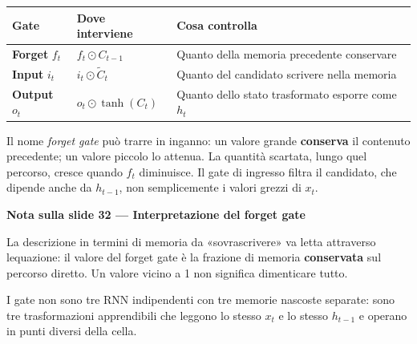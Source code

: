 \documentclass[11pt,a4paper,oneside,openany]{book}
\renewenvironment{quote}{\list{}{\leftmargin=1em\rightmargin=0pt}\item\relax}{\endlist}
\begin{document}
\begin{longtable}[]{@{}
  >{\raggedright\arraybackslash}p{}
  >{\raggedright\arraybackslash}p{}
  >{\raggedright\arraybackslash}p{}@{}}
\toprule\noalign{}
\begin{minipage}[b]{\linewidth}\raggedright
Gate
\end{minipage} & \begin{minipage}[b]{\linewidth}\raggedright
Dove interviene
\end{minipage} & \begin{minipage}[b]{\linewidth}\raggedright
Cosa controlla
\end{minipage} \\
\midrule\noalign{}
\endhead
\bottomrule\noalign{}
\endlastfoot
\textbf{Forget} \(f_t\) & \(f_t\odot C_{t-1}\) & Quanto della memoria precedente conservare \\
\textbf{Input} \(i_t\) & \(i_t\odot\widetilde C_t\) & Quanto del candidato scrivere nella memoria \\
\textbf{Output} \(o_t\) & \(o_t\odot\tanh(C_t)\) & Quanto dello stato trasformato esporre come \(h_t\) \\
\end{longtable}

Il nome \emph{forget gate} può trarre in inganno: un valore grande \textbf{conserva} il contenuto precedente; un valore piccolo lo attenua. La quantità scartata, lungo quel percorso, cresce quando \(f_t\) diminuisce. Il gate di ingresso filtra il candidato, che dipende anche da \(h_{t-1}\), non semplicemente i valori grezzi di \(x_t\).

\begin{quote}
\textbf{Nota sulla slide 32 --- Interpretazione del forget gate}
\end{quote}

\begin{quote}
La descrizione in termini di memoria da «sovrascrivere» va letta attraverso l\textquotesingle equazione: il valore del forget gate è la frazione di memoria \textbf{conservata} sul percorso diretto. Un valore vicino a 1 non significa dimenticare tutto.
\end{quote}

I gate non sono tre RNN indipendenti con tre memorie nascoste separate: sono tre trasformazioni apprendibili che leggono lo stesso \(x_t\) e lo stesso \(h_{t-1}\) e operano in punti diversi della cella.
\end{document}
